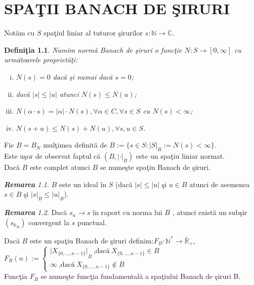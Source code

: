 \documentclass[ a4paper, 12pt]{report}
\newtheorem{definition}{\bf Defini\c tia}[section]
\theoremstyle{remark}
\newtheorem{remarc}{\bf Remarca}[section]
\numberwithin{equation}{section}
\begin{document}
\chapter{SPA\c TII BANACH DE \c SIRURI}


Not\u am cu $S$ spa\c tiul liniar al tuturor \c sirurilor $s:\mathbb{N} \rightarrow \mathbb{C}$.
\begin{definition}
Numim norm\u a Banach de \c siruri o func\c tie $N:S \rightarrow [0,\infty]$ cu urm\u atoarele propriet\u a\c ti:
\begin{enumerate}[(i)]
\item $N(s)=0$ dac\u a \c si numai dac\u a $s=0$;
\item dac\u a $\lvert s \rvert \leq \lvert u \rvert$ atunci $N(s) \leq N(u)$;
\item $N(\alpha \cdot s)=\lvert \alpha \rvert \cdot N(s),\forall \alpha \in C,\forall s \in S$ cu $N(s)<\infty$;
\item $N(s+u) \leq N(s)+N(u),\forall s,u \in S$.
\end{enumerate}
\end{definition}
Fie $B=B_N$ mul\c timea definit\u a de $B:=\{s \in S:{\lvert S \rvert}_B:=N(s)<\infty\}$. \\
Este u\c sor de observat faptul c\u a $(B,{\lvert \cdot \rvert}_B)$ este un spa\c tiu liniar normat.\\
Dac\u a $B$ este complet atunci $B$ se nume\c ste spa\c tiu Banach de \c siruri.
\begin{remarc}
$B$ este un ideal \^in $S$ (dac\u a $\lvert s \rvert \leq \lvert u \rvert$ \c si $u \in B$ atunci de asemenea $s \in B$ \c si ${\lvert s \rvert}_B \leq {\lvert u \rvert}_B$).
\end{remarc}
\begin{remarc}
Dac\u a $s_n \longrightarrow s$ \^in raport cu norma lui $B$ , atunci exist\u a un sub\c sir $({s_k}_n)$ convergent la $s$ punctual.
\end{remarc}
Dac\u a $B$ este un spa\c tiu Banach de \c siruri definim:$F_B:\mathbb{N}^* \rightarrow \bar{\mathbb{R}}_+$,
$F_B(n):=
\begin{cases}
{\lvert X_{\{0,...,n-1\}} \rvert}_B\ \mbox{,dac\u a}\  X_{\{0,...,n-1\}} \in B \\
\infty\ \mbox{,dac\u a}\  X_{\{0,...,n-1\}} \notin B
\end{cases}$\\
Func\c tia $F_B$ se nume\c ste func\c tia fundamental\u a a spa\c tiului Banach de \c siruri B.\\
\end{document}
